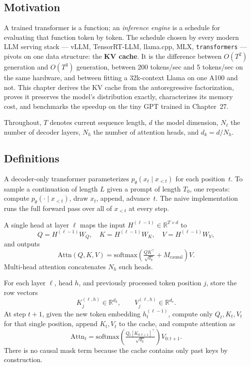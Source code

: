 \subsection*{Motivation}

A trained transformer is a function; an \emph{inference engine} is a schedule for evaluating that function token by token. The schedule chosen by every modern LLM serving stack --- vLLM, TensorRT-LLM, llama.cpp, MLX, \texttt{transformers} --- pivots on one data structure: the \textbf{KV cache}. It is the difference between $O(T^2)$ generation and $O(T^3)$ generation, between 200 tokens/sec and 5 tokens/sec on the same hardware, and between fitting a 32k-context Llama on one A100 and not. This chapter derives the KV cache from the autoregressive factorization, proves it preserves the model's distribution exactly, characterizes its memory cost, and benchmarks the speedup on the tiny GPT trained in Chapter~27.

Throughout, $T$ denotes current sequence length, $d$ the model dimension, $N_\ell$ the number of decoder layers, $N_h$ the number of attention heads, and $d_k = d / N_h$.

\subsection*{Definitions}

\begin{definition}
A decoder-only transformer parameterizes $p_\theta(x_t \mid x_{<t})$ for each position~$t$. To sample a continuation of length $L$ given a prompt of length $T_0$, one repeats: compute $p_\theta(\cdot \mid x_{<t})$, draw $x_t$, append, advance~$t$. The naive implementation runs the full forward pass over all of $x_{<t}$ at every step.
\end{definition}

\begin{remark}
A single head at layer $\ell$ maps the input $H^{(\ell-1)} \in \mathbb{R}^{T \times d}$ to
\[ Q = H^{(\ell-1)} W_Q, \quad K = H^{(\ell-1)} W_K, \quad V = H^{(\ell-1)} W_V, \]
and outputs
\[ \mathrm{Attn}(Q, K, V) = \mathrm{softmax}\!\left(\tfrac{Q K^\top}{\sqrt{d_k}} + M_{\mathrm{causal}}\right) V. \]
Multi-head attention concatenates $N_h$ such heads.
\end{remark}

\begin{definition}[KV cache]
For each layer $\ell$, head $h$, and previously processed token position $j$, store the row vectors
\[ K_j^{(\ell, h)} \in \mathbb{R}^{d_k}, \qquad V_j^{(\ell, h)} \in \mathbb{R}^{d_v}. \]
At step $t+1$, given the new token embedding $h_t^{(\ell-1)}$, compute only $Q_t, K_t, V_t$ for that single position, append $K_t, V_t$ to the cache, and compute attention as
\[ \mathrm{Attn}_t = \mathrm{softmax}\!\left(\tfrac{Q_t [K_{0:t+1}]^\top}{\sqrt{d_k}}\right) V_{0:t+1}. \]
There is no causal mask term because the cache contains only past keys by construction.
\end{definition}

